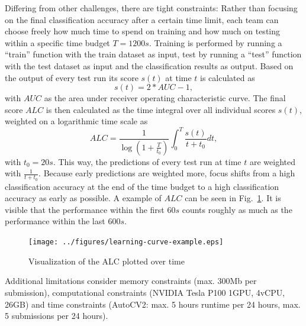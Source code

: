 \documentclass{article}
\begin{document}
Differing from other challenges, there are tight constraints: Rather than focusing on the final classification accuracy after a certain time limit, each team can choose freely how much time to spend on training and how much on testing within a specific time budget $T=1200s$. Training is performed by running a ``train'' function with the train dataset as input, test by running a ``test'' function with the test dataset as input and the classification results as output. Based on the output of every test run its score $s(t)$ at time $t$ is calculated as 
%
\begin{equation}
s(t) = 2*AUC - 1, \nonumber
\end{equation} 
%
with $AUC$ as the area under receiver operating characteristic curve. The final score $ALC$ is then calculated as the time integral over all individual scores $s(t)$, weighted on a logarithmic time scale as
%
\begin{equation}
ALC = \frac{1}{\log \left( 1 + \frac{T}{t_0} \right)} \int_0^T \frac{s(t)}{t+t_0} dt, \nonumber
\label{eq:ALC}
\end{equation} 
%
with $t_0=20s$. This way, the predictions of every test run at time $t$ are weighted with $\frac{1}{t+t_0}$. Because early predictions are weighted more, focus shifts from a high classification accuracy at the end of the time budget to a high classification accuracy as early as possible. A example of $ALC$ can be seen in Fig.~\ref{fig:learningCurveExample}. It is visible that the performance within the first $60s$ counts roughly as much as the performance within the last $600s$.
%
\begin{figure}[htb]
\begin{center}
 	\texttt{[image: ../figures/learning-curve-example.eps]} 
\end{center}
\caption{Visualization of the ALC plotted over time}
\label{fig:learningCurveExample}
\end{figure} 
%
Additional limitations consider memory constraints (max. 300Mb per submission), computational constraints (NVIDIA Tesla P100 1GPU, 4vCPU, 26GB) and time constraints (AutoCV2: max. 5 hours runtime per 24 hours, max. 5 submissions per 24 hours).


\end{document}

